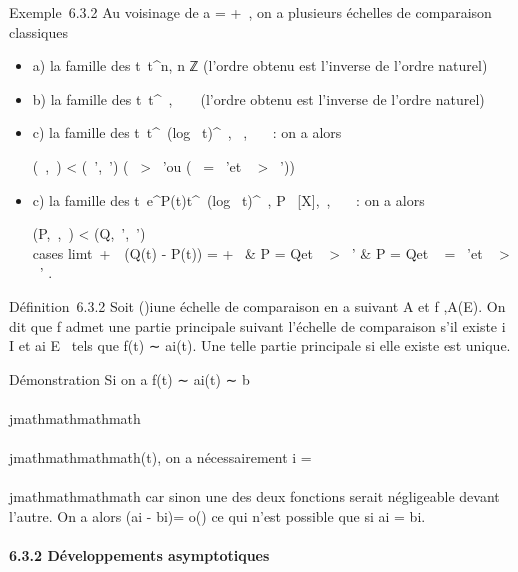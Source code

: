 Exemple~6.3.2 Au voisinage de a = +\infty~, on a plusieurs échelles de
comparaison classiques

\begin{itemize}
\item
  a) la famille des t\mapsto~t^n, n \in ℤ
  (l'ordre obtenu est l'inverse de l'ordre naturel)
\item
  b) la famille des t\mapsto~t^\alpha~, \alpha~ \in {}~
  (l'ordre obtenu est l'inverse de l'ordre naturel)
\item
  c) la famille des
  t\mapsto~t^\alpha~(log~
  t)^\beta~, \alpha~,\beta~ \in {}~~: on a alors

  (\alpha~,\beta~) \textless{} (\alpha~',\beta~') \Leftrightarrow
  \bigl (\alpha~ \textgreater{} \alpha~'\text ou
  (\alpha~ = \alpha~'\text et \beta~ \textgreater{}
  \beta~')\bigr )
\item
  c) la famille des
  t\mapsto~e^P(t)t^\alpha~(log~
  t)^\beta~, P \in {}~{[}X{]},\alpha~,\beta~ \in {}~~: on a alors

  (P,\alpha~,\beta~) \textless{} (Q,\alpha~',\beta~') \Leftrightarrow
  \left \\cases
  limt\rightarrow~+\infty~~(Q(t) - P(t)) = +\infty~
  \cr \cr \textou &
  \cr P = Q\text et \alpha~ \textgreater{}
  \alpha~' \cr \textou & \cr
  P = Q\text et \alpha~ = \alpha~'\text et \beta~
  \textgreater{} \beta~'  \right .
\end{itemize}

Définition~6.3.2 Soit (\phii)i\inI une échelle de
comparaison en a suivant A et f ,A(E). On dit que f admet
une partie principale suivant l'échelle de comparaison s'il existe i \in I
et ai \in E \diagdown\0\ tels que f(t)
∼ ai\phii(t). Une telle partie principale si elle
existe est unique.

Démonstration Si on a f(t) ∼ ai\phii(t) ∼
b\\\\jmathmathmathmath\phi\\\\jmathmathmathmath(t), on a nécessairement i = \\\\jmathmathmathmath car sinon une des
deux fonctions serait négligeable devant l'autre. On a alors
(ai - bi)\phii = o(\phii) ce qui n'est
possible que si ai = bi.

\paragraph{6.3.2 Développements asymptotiques}


